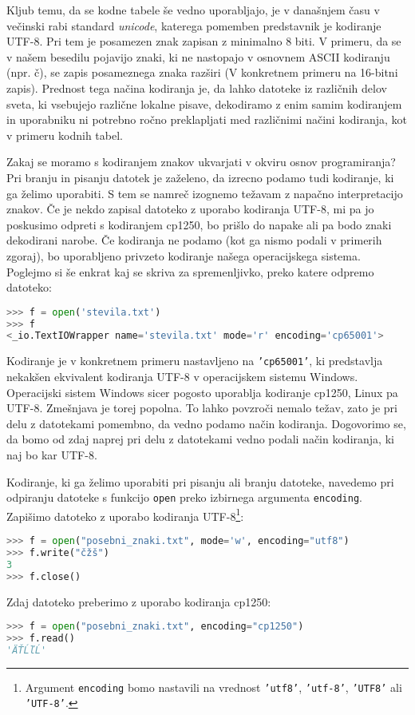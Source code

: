 Kljub temu, da se kodne tabele še vedno uporabljajo, je v današnjem času v večinski rabi standard \emph{unicode}, katerega pomemben predstavnik je kodiranje UTF-8. Pri tem je posamezen znak zapisan z minimalno 8 biti. V primeru, da se v našem besedilu pojavijo znaki, ki ne nastopajo v osnovnem ASCII kodiranju (npr. č), se zapis posameznega znaka razširi (V konkretnem primeru na 16-bitni zapis). Prednost tega načina kodiranja je, da lahko datoteke iz različnih delov sveta, ki vsebujejo različne lokalne pisave, dekodiramo z enim samim kodiranjem in uporabniku ni potrebno ročno preklapljati med različnimi načini kodiranja, kot v primeru kodnih tabel.

Zakaj se moramo s kodiranjem znakov ukvarjati v okviru osnov programiranja? Pri branju in pisanju datotek je zaželeno, da izrecno podamo tudi kodiranje, ki ga želimo uporabiti. S tem se namreč izognemo težavam z napačno interpretacijo znakov. Če je nekdo zapisal datoteko z uporabo kodiranja UTF-8, mi pa jo poskusimo odpreti s kodiranjem cp1250, bo prišlo do napake ali pa bodo znaki dekodirani narobe. Če kodiranja ne podamo (kot ga nismo podali v primerih zgoraj), bo uporabljeno privzeto kodiranje našega operacijskega sistema. Poglejmo si še enkrat kaj se skriva za spremenljivko, preko katere odpremo datoteko:
\begin{lstlisting}[language=Python, showstringspaces=false]
>>> f = open('stevila.txt')
>>> f 
<_io.TextIOWrapper name='stevila.txt' mode='r' encoding='cp65001'>
\end{lstlisting}
Kodiranje  je v konkretnem primeru nastavljeno na \texttt{'cp65001'}, ki predstavlja nekakšen ekvivalent kodiranja UTF-8 v operacijskem sistemu Windows. Operacijski sistem Windows sicer pogosto uporablja kodiranje cp1250, Linux pa UTF-8. Zmešnjava je torej popolna. To lahko povzroči nemalo težav, zato je pri delu z datotekami pomembno, da vedno podamo način kodiranja. Dogovorimo se, da bomo od zdaj naprej pri delu z datotekami vedno podali način kodiranja, ki naj bo kar UTF-8. 

Kodiranje, ki ga želimo uporabiti pri pisanju ali branju datoteke, navedemo pri odpiranju datoteke s funkcijo \texttt{open} preko izbirnega argumenta \texttt{encoding}. Zapišimo datoteko z uporabo kodiranja UTF-8\footnote{Argument \texttt{encoding} bomo nastavili na vrednost \texttt{'utf8'}, \texttt{'utf-8'}, \texttt{'UTF8'} ali \texttt{'UTF-8'}.}:
\begin{lstlisting}[language=Python, showstringspaces=false]
>>> f = open("posebni_znaki.txt", mode='w', encoding="utf8")
>>> f.write("čžš")
3
>>> f.close()
\end{lstlisting}
Zdaj datoteko preberimo z uporabo kodiranja cp1250:
\begin{lstlisting}[language=Python]
>>> f = open("posebni_znaki.txt", encoding="cp1250")
>>> f.read()
'ÄŤĹľĹ'
\end{lstlisting}

